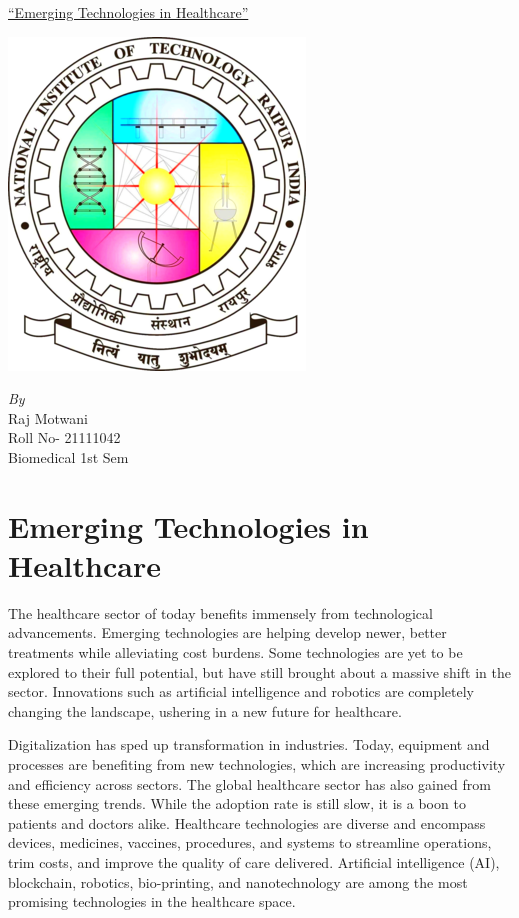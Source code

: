 \documentclass[12pt]{article}
\begin{document}
\begin{center}
\huge\underline{``Emerging Technologies in Healthcare''}
\end{center}
\begin{center}
 \includegraphics[scale=0.8]{nitlogo.png }
\end{center}
\vspace{1cm}
\begin{center}
   \emph{\large By}\\
\Large{Raj Motwani }\\
\large{Roll No- 21111042}\\
\large{Biomedical 1st Sem}\\
\end{center}
\clearpage
\section*{Emerging Technologies in Healthcare}
The healthcare sector of today benefits immensely from technological advancements. Emerging technologies are helping develop newer, better treatments while alleviating cost burdens. Some technologies are yet to be explored to their full potential, but have still brought about a massive shift in the sector. Innovations such as artificial intelligence and robotics are completely changing the landscape, ushering in a new future for healthcare.

Digitalization has sped up transformation in industries. Today, equipment and processes are benefiting from new technologies, which are increasing productivity and efficiency across sectors. The global healthcare sector has also gained from these emerging trends. While the adoption rate is still slow, it is a boon to patients and doctors alike.
Healthcare technologies are diverse and encompass devices, medicines, vaccines, procedures, and systems to streamline operations, trim costs, and improve the quality of care delivered. Artificial intelligence (AI), blockchain, robotics, bio-printing, and nanotechnology are among the most promising technologies in the healthcare space.
\end{document}

